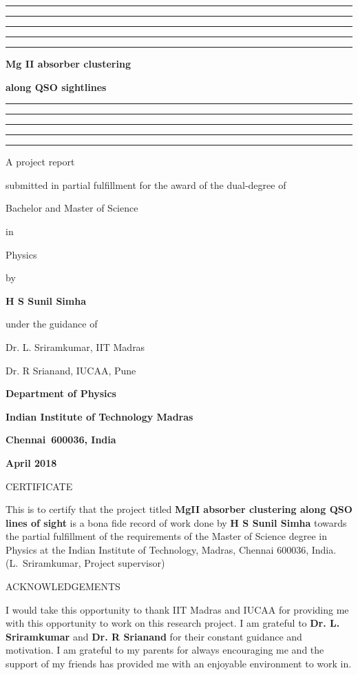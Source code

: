 \documentclass[12pt,a4paper,twoside]{book}
\begin{document}

\baselineskip 20pt




\thispagestyle{empty}
\topskip 15pt
\hrule\hrule\hrule\hrule\hrule
\vskip 20pt
\centerline{\Huge \bf Mg II absorber clustering} 
\vskip 15pt
\centerline{\Huge \bf along QSO sightlines} 
\vskip 20pt
\hrule\hrule\hrule\hrule\hrule
\vskip 30pt
\centerline{\Large A project report}
\vskip 8pt
\centerline{\Large submitted in partial fulfillment 
for the award of the dual-degree of}
\vskip 8pt
\centerline{\Large Bachelor and Master of Science}
\vskip 8pt
\centerline{\Large in}
\vskip 8pt 
\centerline{\Large Physics}
\vskip 8pt
\centerline{\Large by}
\vskip 8pt
\centerline{\Large \bf H S Sunil Simha}
\vskip 8pt
\centerline{\Large under the guidance of}
\vskip 8pt
\centerline{\Large  Dr. L. Sriramkumar, IIT Madras}

\vskip 8pt
\centerline{\Large  Dr. R Srianand, IUCAA, Pune}
\vskip 30pt 
\begin{center}
\end{center}
\vskip 8pt 
\centerline{\Large \bf Department of Physics}
\vskip 8pt 
\centerline{\Large \bf Indian Institute of Technology Madras}
\vskip 8pt 
\centerline{\Large \bf Chennai~600036, India}
\vskip 8pt
\centerline{\Large \bf April 2018}

\newpage\topskip 40pt
\centerline{\Large CERTIFICATE}
\thispagestyle{empty}
\vskip 20pt\noindent 
This is to certify that the project titled {\bf MgII absorber clustering along QSO lines of sight} is a bona fide record of work done by 
{\bf H S Sunil Simha} towards the partial fulfillment of the 
requirements of the Master of Science degree in Physics at the Indian 
Institute of Technology, Madras, Chennai 600036, India.
\vskip 120pt
\hspace{240pt}(L.~Sriramkumar, Project supervisor)


\newpage\topskip 40pt
\thispagestyle{empty}
\centerline{\Large ACKNOWLEDGEMENTS}
\vskip 20pt\noindent 
I would take this opportunity to thank IIT Madras and IUCAA for providing me with this opportunity to work on this research project. I am grateful to {\bf Dr. L. Sriramkumar} and {\bf Dr. R Srianand} for their constant
guidance and motivation. 
I am grateful to my parents for always encouraging me and the support of my
friends has provided me with an enjoyable environment to work in.
\end{document}
